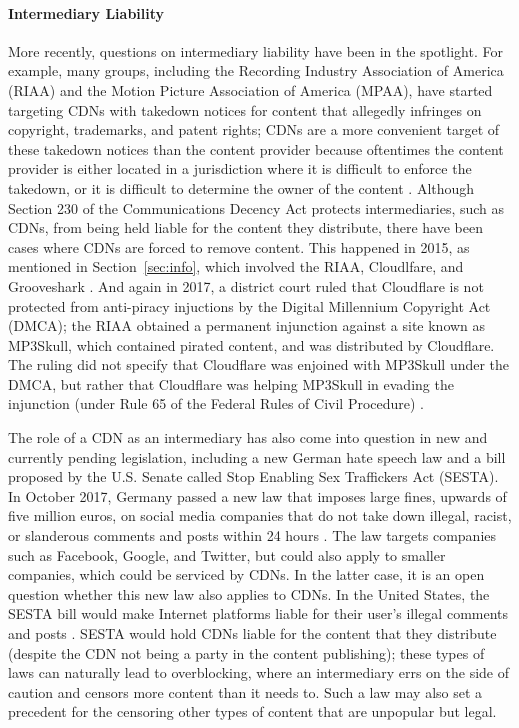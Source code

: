 \paragraph{Intermediary Liability}
More recently, questions on intermediary liability have been in the spotlight.  For example, many groups, including the Recording Industry 
Association of America (RIAA) and the Motion Picture Association of America (MPAA), have started targeting CDNs with takedown notices for 
content that allegedly infringes on copyright, trademarks, and patent rights; CDNs are a more convenient target of these takedown notices than 
the content provider because oftentimes the content provider is either located in a jurisdiction where it is difficult to enforce the takedown, 
or it is difficult to determine the owner of the content \cite{medium_copyright,eff_copyright}.
Although Section 230 of the Communications Decency Act protects intermediaries,
such as CDNs, from being held
liable for the content they distribute, there have been cases where CDNs are forced
to remove content.  This happened in 2015, as mentioned in Section~\ref{sec:info}, which 
involved the RIAA, Cloudlfare, and Grooveshark \cite{techdirt_copyright}.  
And again in 2017, a district court ruled that Cloudflare is not protected from anti-piracy injuctions by the Digital Millennium Copyright Act (DMCA); the 
RIAA obtained a permanent injunction against a site known as MP3Skull, which contained pirated content, and was distributed by Cloudflare.  The ruling 
did not specify that Cloudflare was enjoined with MP3Skull under the DMCA, but rather that Cloudflare was helping MP3Skull in evading the injunction (under 
Rule 65 of the Federal Rules of Civil Procedure) \cite{stack_copyright}.

The role of a CDN as an intermediary has also come into question in new and currently
pending legislation, including a new German hate speech law and
a bill proposed by the U.S. Senate called Stop Enabling Sex Traffickers Act (SESTA).  In October 2017, Germany passed a new law that imposes large fines, upwards of five million euros,
on social media companies that do not take down illegal, racist, or slanderous comments and posts within 24 hours \cite{nytimes_hatespeech}.  The law 
targets companies such as Facebook, Google, and Twitter, but could also apply to
smaller companies, which could be serviced by CDNs.  In the latter case, it is
an open question whether this new law also applies to CDNs.  In the United States,
the SESTA bill would make Internet platforms liable for their user's illegal comments
and posts \cite{medium_sesta}.  SESTA would hold CDNs liable for the content that
they distribute (despite the CDN not being a party in the content publishing); these
types of laws can naturally lead to overblocking, where an intermediary errs on
the side of caution and censors more content than it needs to.
Such a law may also set a precedent 
for the censoring other types of content that are unpopular but legal. 
